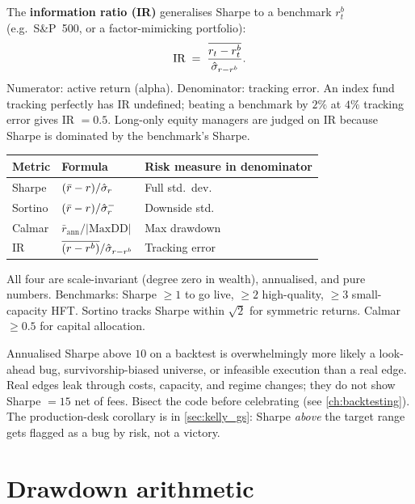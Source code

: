 The \textbf{information ratio (IR)} generalises Sharpe to a
benchmark $r^{b}_t$ (e.g.\ S\&P~500, or a factor-mimicking
portfolio):
\begin{equation}
  \text{IR} \;=\;
  \frac{\overline{r_t - r^{b}_t}}{\hat{\sigma}_{r - r^{b}}}.
\end{equation}
Numerator: active return (alpha). Denominator: tracking error. An
index fund tracking perfectly has IR undefined; beating a
benchmark by $2\%$ at $4\%$ tracking error gives IR $= 0.5$.
Long-only equity managers are judged on IR because Sharpe is
dominated by the benchmark's Sharpe.

\begin{keyfactbox}
\begin{center}
\begin{tabular}{lll}
  \toprule
  Metric & Formula & Risk measure in denominator \\
  \midrule
  Sharpe   & $(\bar r - r)/\hat{\sigma}_r$        & Full std.\ dev.\\
  Sortino  & $(\bar r - r)/\hat{\sigma}^{-}_r$   & Downside std.\\
  Calmar   & $\bar r_{\text{ann}}/|\text{MaxDD}|$   & Max drawdown \\
  IR       & $\overline{(r - r^{b})}/\hat{\sigma}_{r-r^{b}}$
           & Tracking error \\
  \bottomrule
\end{tabular}
\end{center}
All four are scale-invariant (degree zero in wealth), annualised,
and pure numbers. Benchmarks: Sharpe $\geq 1$ to go live,
$\geq 2$ high-quality, $\geq 3$ small-capacity HFT. Sortino
tracks Sharpe within $\sqrt{2}$ for symmetric returns. Calmar
$\geq 0.5$ for capital allocation.
\end{keyfactbox}

\begin{pitfallbox}
Annualised Sharpe above $10$ on a backtest is overwhelmingly more
likely a look-ahead bug, survivorship-biased universe, or
infeasible execution than a real edge. Real edges leak through
costs, capacity, and regime changes; they do not show Sharpe
$= 15$ net of fees. Bisect the code before celebrating (see
\cref{ch:backtesting}). The production-desk corollary is in
\cref{sec:kelly_gs}: Sharpe \emph{above} the target range gets
flagged as a bug by risk, not a victory.
\end{pitfallbox}

\section{Drawdown arithmetic}
\label{sec:drawdown_math}

